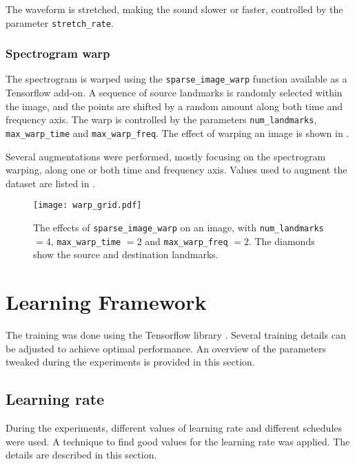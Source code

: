 The waveform is stretched, making the sound slower or faster, controlled by the
parameter \texttt{stretch\_rate}.

\subsubsection{Spectrogram warp}

The spectrogram is warped using the \texttt{sparse\_image\_warp} function
available as a Tensorflow add-on.
A sequence of source landmarks is randomly selected within the image, and the
points are shifted by a random amount along both time and frequency axis. The
warp is controlled by the parameters \texttt{num\_landmarks},
\texttt{max\_warp\_time} and \texttt{max\_warp\_freq}.
The effect of warping an image is shown in .

Several augmentations were performed, mostly focusing on the spectrogram
warping, along one or both time and frequency axis.
Values used to augment the dataset are listed in .

\begin{figure}[t!]
    \centering
    \texttt{[image: warp\_grid.pdf]}
    \caption{
    The effects of \texttt{sparse\_image\_warp} on an image, with
\texttt{num\_landmarks} $=4$, \texttt{max\_warp\_time} $=2$ and
\texttt{max\_warp\_freq} $=2$. The diamonds show the source and destination
landmarks.}%
    \label{fig:warp_grid}
\end{figure}

\section{Learning Framework}
\label{sec:learning_framework}


The training was done using the Tensorflow library \cite{tensorflow2015-whitepaper}.
Several training details can be adjusted to achieve optimal performance.
An overview of the parameters tweaked during the experiments is provided in
this section.

\subsection{Learning rate}

During the experiments, different values of learning rate and different
schedules were used.
A technique to find good values for the learning rate was applied.
The details are described in this section.

